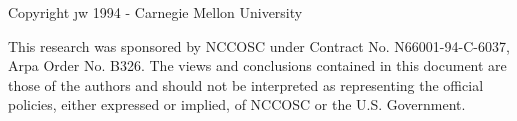 \begin{center}
Copyright \j{w} 1994 - Carnegie Mellon University\end{center}


This research was sponsored by NCCOSC under Contract No.
N66001-94-C-6037, Arpa Order No. B326.
The views and conclusions contained in this document are those of
the authors and should not be interpreted as representing the
official policies, either expressed or implied, of NCCOSC or the U.S.
Government.
